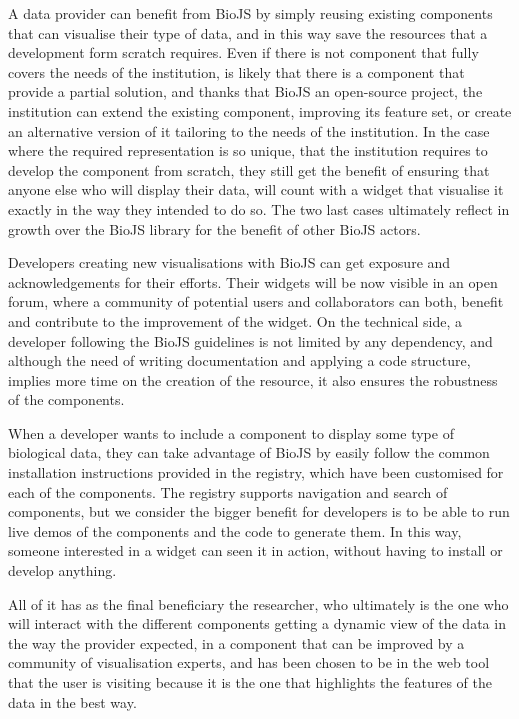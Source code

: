 A data provider can benefit from BioJS by simply reusing existing components that can visualise their type of data, and in this way save the resources that a development form scratch requires. Even if there is not component that fully covers the needs of the institution, is likely that there is a component that provide a partial solution, and thanks that BioJS an open-source project, the institution can extend the existing component, improving its feature set, or create an alternative version of it tailoring to the needs of the institution. In the case where the required representation is so unique, that the institution requires to develop the component from scratch, they still get the benefit of ensuring that anyone else who will display their data, will count with a widget that visualise it exactly in the way they intended to do so. The two last cases ultimately reflect in growth over the BioJS library for the benefit of other BioJS actors.

Developers creating new visualisations with BioJS can get exposure and acknowledgements for their efforts. Their widgets will be now visible in an open forum, where a community of potential users and collaborators can both, benefit and contribute to the improvement of the widget. On the technical side, a developer following the BioJS guidelines is not limited by any dependency, and although the need of writing documentation and applying a code structure, implies more time on the creation of the resource, it also ensures the robustness of the components.

When a developer wants to include a component to display some type of biological data, they can take advantage of BioJS by easily follow the common installation instructions provided in the registry, which have been customised for each of the components. The registry supports navigation and search of components, but we consider the bigger benefit for developers is to be able to run live demos of the components and the code to generate them. In this way, someone interested in a widget can seen it in action, without having to install or develop anything.

All of it has as the final beneficiary the researcher, who ultimately is the one who will interact with the different components getting a dynamic view of the data in the way the provider expected, in a component that can be improved by a community of visualisation experts, and has been chosen to be in the web tool that the user is visiting because it is the one that highlights the features of the data in the best way.

